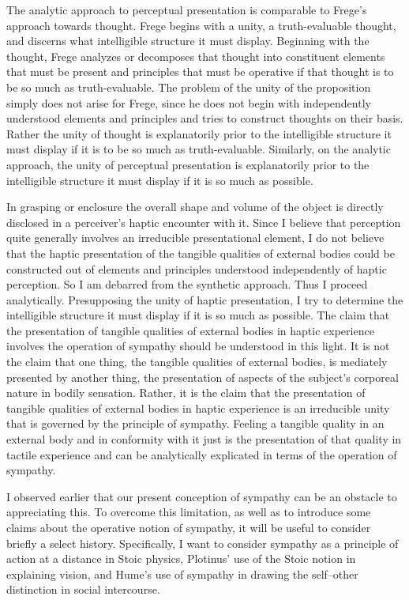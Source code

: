 \documentclass[12pt]{article}
\begin{document}
The analytic approach to perceptual presentation is comparable to Frege's approach towards thought. Frege begins with a unity, a truth-evaluable thought, and discerns what intelligible structure it must display. Beginning with the thought, Frege analyzes or decomposes that thought into constituent elements that must be present and principles that must be operative if that thought is to be so much as truth-evaluable. The problem of the unity of the proposition simply does not arise for Frege, since he does not begin with independently understood elements and principles and tries to construct thoughts on their basis. Rather the unity of thought is explanatorily prior to the intelligible structure it must display if it is to be so much as truth-evaluable. Similarly, on the analytic approach, the unity of perceptual presentation is explanatorily prior to the intelligible structure it must display if it is so much as possible.

In grasping or enclosure the overall shape and volume of the object is directly disclosed in a perceiver's haptic encounter with it. Since I believe that perception quite generally involves an irreducible presentational element, I do not believe that the haptic presentation of the tangible qualities of external bodies could be constructed out of elements and principles understood independently of haptic perception. So I am debarred from the synthetic approach. Thus I proceed analytically. Presupposing the unity of haptic presentation, I try to determine the intelligible structure it must display if it is so much as possible. The claim that the presentation of tangible qualities of external bodies in haptic experience involves the operation of sympathy should be understood in this light. It is not the claim that one thing, the tangible qualities of external bodies, is mediately presented by another thing, the presentation of aspects of the subject's corporeal nature in bodily sensation. Rather, it is the claim that the presentation of tangible qualities of external bodies in haptic experience is an irreducible unity that is governed by the principle of sympathy. Feeling a tangible quality in an external body and in conformity with it just is the presentation of that quality in tactile experience and can be analytically explicated in terms of the operation of sympathy.

I observed earlier that our present conception of sympathy can be an obstacle to appreciating this. To overcome this limitation, as well as to introduce some claims about the operative notion of sympathy, it will be useful to consider briefly a select history. Specifically, I want to consider sympathy as a principle of action at a distance in Stoic physics, Plotinus' use of the Stoic notion in explaining vision, and Hume's use of sympathy in drawing the self--other distinction in social intercourse. 




\end{document}
